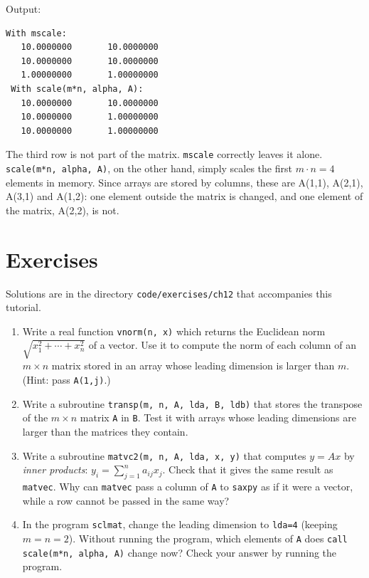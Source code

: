 Output:

\begin{lstlisting}[style=output]
 With mscale:
   10.0000000       10.0000000
   10.0000000       10.0000000
   1.00000000       1.00000000
 With scale(m*n, alpha, A):
   10.0000000       10.0000000
   10.0000000       1.00000000
   10.0000000       1.00000000
\end{lstlisting}

The third row is not part of the matrix. \texttt{mscale} correctly leaves it alone. \texttt{scale(m*n, alpha, A)}, on the other hand, simply scales the first $m \cdot n = 4$ elements in memory. Since arrays are stored by columns, these are A(1,1), A(2,1), A(3,1) and A(1,2): one element outside the matrix is changed, and one element of the matrix, A(2,2), is not.

\section{Exercises}

Solutions are in the directory \texttt{code/exercises/ch12} that accompanies this tutorial.

\begin{enumerate}
    \item Write a real function \texttt{vnorm(n, x)} which returns the Euclidean norm $\sqrt{x_1^2 + \cdots + x_n^2}$ of a vector. Use it to compute the norm of each column of an $m \times n$ matrix stored in an array whose leading dimension is larger than $m$. (Hint: pass \texttt{A(1,j)}.)
    \item Write a subroutine \texttt{transp(m, n, A, lda, B, ldb)} that stores the transpose of the $m \times n$ matrix \texttt{A} in \texttt{B}. Test it with arrays whose leading dimensions are larger than the matrices they contain.
    \item Write a subroutine \texttt{matvc2(m, n, A, lda, x, y)} that computes $y = Ax$ by \emph{inner products}: $y_i = \sum_{j=1}^{n} a_{ij} x_j$. Check that it gives the same result as \texttt{matvec}. Why can \texttt{matvec} pass a column of \texttt{A} to \texttt{saxpy} as if it were a vector, while a row cannot be passed in the same way?
    \item In the program \texttt{sclmat}, change the leading dimension to \texttt{lda=4} (keeping $m = n = 2$). Without running the program, which elements of \texttt{A} does \texttt{call scale(m*n, alpha, A)} change now? Check your answer by running the program.
\end{enumerate}
